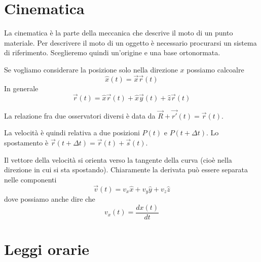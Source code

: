 \documentclass[a4paper]{article}
\begin{document}
\pagebreak

\section{Cinematica}

La cinematica è la parte della meccanica che descrive il moto di un punto materiale.
Per descrivere il moto di un oggetto è necessario procurarsi un sistema di riferimento.
Sceglieremo quindi un'origine e una base ortonormata.


Se vogliamo considerare la posizione solo nella direzione \(x\)
possiamo calcoalre
\[
    \hat{x}(t) = \vec{x}\vec{r}(t)
\]
In generale
\[
    \vec{r}(t) = \hat{x}\vec{r}(t) + \hat{x}\vec{y}(t) + \hat{z}\vec{r}(t)
\]

La relazione fra due osservatori diversi è data da \(\vec{R} + \vec{r'}(t) = \vec{r}(t)\).

La velocità è quindi relativa a due posizioni \(P(t)\) e \(P(t + \Delta t)\).
Lo spostamento è \(\vec{r}(t + \Delta t) = \vec{r}(t) + \vec{s}(t)\).


Il vettore della velocità si orienta verso la tangente della curva (cioè nella direzione in cui si sta spostando).
Chiaramente la derivata può essere separata nelle componenti
\[
    \vec{v}(t)=v_x\hat{x} + v_y\hat{y} + v_z\hat{z}
\]
dove possiamo anche dire che
\[
    v_x(t) = \frac{dx(t)}{dt}
\]


\section{Leggi orarie}
\end{document}
